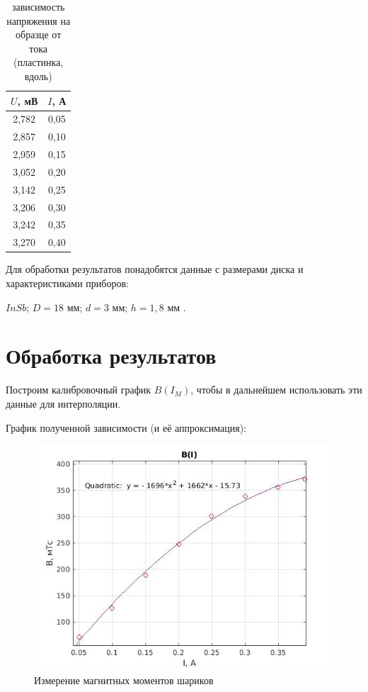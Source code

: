 \documentclass[a4paper, 12pt]{article}%
\begin{document}
\begin{table}[!h]
\begin{center}
\begin{tabular}{|c|c|}
\hline	$U$, мВ  & $I$, А  \\
\hline 2,782 & 0,05 \\
\hline 2,857 & 0,10 \\
\hline 2,959 & 0,15 \\
\hline 3,052 & 0,20 \\
\hline 3,142 & 0,25 \\
\hline 3,206 & 0,30 \\
\hline 3,242 & 0,35 \\
\hline 3,270 & 0,40 \\
\hline
\end{tabular}
\end{center}
\caption{зависимость напряжения на образце от тока (пластинка, вдоль)}
\end{table}


Для обработки результатов понадобятся данные с размерами диска и характеристиками приборов:

$InSb$; $D = 18\text{ мм}$; $d = 3\text{ мм}$; $h = 1,8\text{ мм}$ .





\section{Обработка результатов}

Построим калибровочный график $B(I_M)$, чтобы в дальнейшем использовать эти данные для интерполяции.


График полученной зависимости (и её аппроксимация):

\begin{center}
\begin{figure}[h]
    \centering
    \includegraphics[width = 10 cm]{B(I).jpg}
    \caption{Измерение магнитных моментов шариков}
    \label{msh1}
\end{figure}
\end{center}
\end{document}
